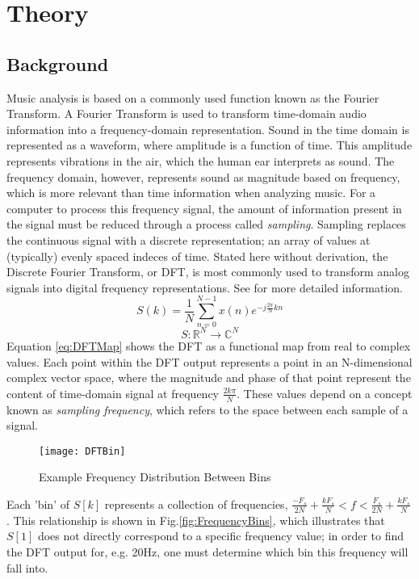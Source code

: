 \documentclass[conference]{IEEEtran}
\begin{document}
\section{Theory}\label{sec:Theory}
\subsection{Background}\label{sec:Background}
Music analysis is based on a commonly used function known as the Fourier Transform. A Fourier Transform is used to transform time-domain audio information into a frequency-domain representation. Sound in the time domain is represented as a waveform, where amplitude is a function of time. This amplitude represents vibrations in the air, which the human ear interprets as sound. The frequency domain, however, represents sound as magnitude based on frequency, which is more relevant than time information when analyzing music. For a computer to process this frequency signal, the amount of information present in the signal must be reduced through a process called \textit{sampling}. Sampling replaces the continuous signal with a discrete representation; an array of values at (typically) evenly spaced indeces of time. Stated here without derivation, the Discrete Fourier Transform, or DFT, is most commonly used to transform analog signals into digital frequency representations. See \cite{proakisDigitalSignalProcessing2007} for more detailed information.
\begin{equation}\label{eq:DFT}
  S(k)=\frac{1}{N}\sum_{n=0}^{N-1}x(n)e^{-j\frac{2\pi}{N}kn}
\end{equation}
\begin{equation}\label{eq:DFTMap}
  S: \mathbb{R}^{N}\rightarrow\mathbb{C}^N
\end{equation}
Equation \eqref{eq:DFTMap} shows the DFT as a functional map from real to complex values. Each point within the DFT output represents a point in an N-dimensional complex vector space, where the magnitude and phase of that point represent the content of time-domain signal at frequency $\frac{2k\pi}{N}$. These values depend on a concept known as \textit{sampling frequency}, which refers to the space between each sample of a signal.
\begin{figure}[!htb]
  \texttt{[image: DFTBin]}
  \caption{Example Frequency Distribution Between Bins}\label{fig:FrequencyBins}
\end{figure}

Each 'bin' of $S[k]$ represents a collection of frequencies, $\frac{-F_{s}}{2N} + \frac{kF_{s}}{N} < f < \frac{F_{s}}{2N} + \frac{kF_{s}}{N}$. This relationship is shown in Fig.\eqref{fig:FrequencyBins}, which illustrates that $S[1]$ does not directly correspond to a specific frequency value; in order to find the DFT output for, e.g. 20Hz, one must determine which bin this frequency will fall into.
\end{document}
